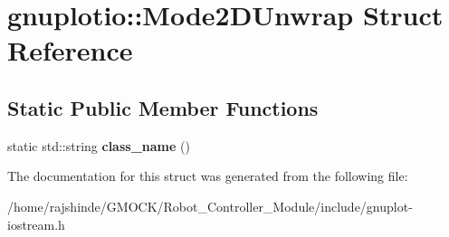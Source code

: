\hypertarget{structgnuplotio_1_1_mode2_d_unwrap}{}\section{gnuplotio\+:\+:Mode2\+D\+Unwrap Struct Reference}
\label{structgnuplotio_1_1_mode2_d_unwrap}
\subsection*{Static Public Member Functions}
\begin{DoxyCompactItemize}
\item 
static std\+::string {\bfseries class\+\_\+name} ()\hypertarget{structgnuplotio_1_1_mode2_d_unwrap_ab2f533c9ceb52cfecaa161c64316deb9}{}\label{structgnuplotio_1_1_mode2_d_unwrap_ab2f533c9ceb52cfecaa161c64316deb9}

\end{DoxyCompactItemize}


The documentation for this struct was generated from the following file\+:\begin{DoxyCompactItemize}
\item 
/home/rajshinde/\+G\+M\+O\+C\+K/\+Robot\+\_\+\+Controller\+\_\+\+Module/include/gnuplot-\/iostream.\+h\end{DoxyCompactItemize}

